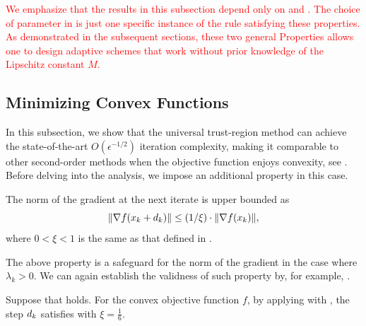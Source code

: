 \textcolor{red}{
We emphasize that the results in this subsection depend only on  and . The choice of parameter in  is just one specific instance of the rule satisfying these properties. As demonstrated in the subsequent sections, these two general Properties allows one to design adaptive schemes that work without prior knowledge of the Lipschitz constant $M$.
}

\subsection{Minimizing Convex Functions}
In this subsection, we show that the universal trust-region method can achieve the state-of-the-art $O(\epsilon^{-1/2})$ iteration complexity,  making it comparable to other second-order methods when the objective function enjoys convexity, see \cite{nesterov2006cubic,doikov_super-universal_2024,doikov2024gradient,mishchenko_regularized_2023}. Before delving into the analysis, we impose an additional property in this case.
\begin{property}
    \label{cond.convex gradient}
    The norm of the gradient at the next iterate is upper bounded as
    \begin{equation}
        \label{eq.convex gradient}
        \|\nabla f(x_k+d_k)\| \leq \left(1/\xi\right ) \cdot \|\nabla f(x_k)\|,
    \end{equation}
    where $0<\xi<1$ is the same as that defined in .
\end{property}
The above property is a safeguard for the norm of the gradient in the case where $\lambda_k > 0$. We can again establish the validness of such property by, for example, .
\begin{lemma}
    \label{cor.gradient no blow cvx}
    Suppose that  holds. For the convex objective function $f$, by applying  with , the step $d_k$ satisfies  with $\xi = \frac{1}{6}$.
\end{lemma}
